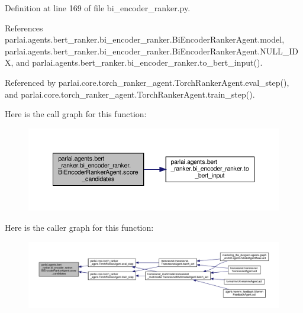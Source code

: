 Definition at line 169 of file bi\+\_\+encoder\+\_\+ranker.\+py.



References parlai.\+agents.\+bert\+\_\+ranker.\+bi\+\_\+encoder\+\_\+ranker.\+Bi\+Encoder\+Ranker\+Agent.\+model, parlai.\+agents.\+bert\+\_\+ranker.\+bi\+\_\+encoder\+\_\+ranker.\+Bi\+Encoder\+Ranker\+Agent.\+N\+U\+L\+L\+\_\+\+I\+DX, and parlai.\+agents.\+bert\+\_\+ranker.\+bi\+\_\+encoder\+\_\+ranker.\+to\+\_\+bert\+\_\+input().



Referenced by parlai.\+core.\+torch\+\_\+ranker\+\_\+agent.\+Torch\+Ranker\+Agent.\+eval\+\_\+step(), and parlai.\+core.\+torch\+\_\+ranker\+\_\+agent.\+Torch\+Ranker\+Agent.\+train\+\_\+step().

Here is the call graph for this function\+:
\nopagebreak
\begin{figure}[H]
\begin{center}
\leavevmode
\includegraphics[width=350pt]{classparlai_1_1agents_1_1bert__ranker_1_1bi__encoder__ranker_1_1BiEncoderRankerAgent_ac8141b70cff9c26b945d112ad53b035c_cgraph}
\end{center}
\end{figure}
Here is the caller graph for this function\+:
\nopagebreak
\begin{figure}[H]
\begin{center}
\leavevmode
\includegraphics[width=350pt]{classparlai_1_1agents_1_1bert__ranker_1_1bi__encoder__ranker_1_1BiEncoderRankerAgent_ac8141b70cff9c26b945d112ad53b035c_icgraph}
\end{center}
\end{figure}
\mbox{\label{classparlai_1_1agents_1_1bert__ranker_1_1bi__encoder__ranker_1_1BiEncoderRankerAgent_acdfa23a21c8364e7205093a5af51264f}} 
